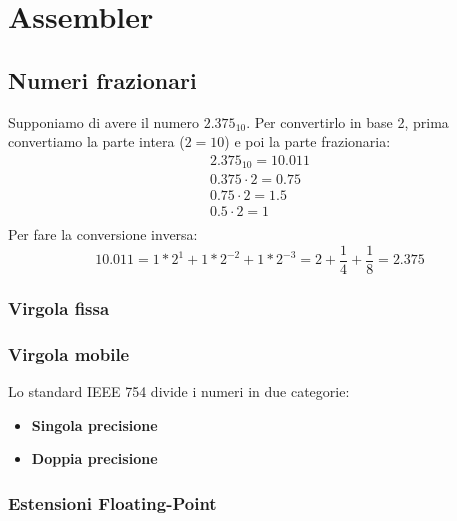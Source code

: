 \newpage
\section{Assembler}
\subsection{Numeri frazionari}
Supponiamo di avere il numero $2.375_{10}$. Per convertirlo in base 2, prima convertiamo la parte intera ($2=10$) e poi la parte frazionaria:
\begin{equation*}
	\begin{split}
		2.375_{10} = 10.011 \\
		0.375 \cdot 2 = 0.75 \\
		0.75 \cdot 2 = 1.5 \\
		0.5 \cdot 2 = 1 \\
	\end{split}
\end{equation*}
Per fare la conversione inversa:
\begin{equation*}
	10.011 = 1*2^1 + 1 * 2^{-2} + 1 * 2^{-3}=2+\frac{1}{4} + \frac{1}{8} = 2.375
\end{equation*}
\subsubsection{Virgola fissa}
\subsubsection{Virgola mobile}
Lo standard IEEE 754 divide i numeri in due categorie:
\begin{itemize}
	\item \textbf{Singola precisione}
	\item \textbf{Doppia precisione}
\end{itemize}

\subsubsection{Estensioni Floating-Point}
